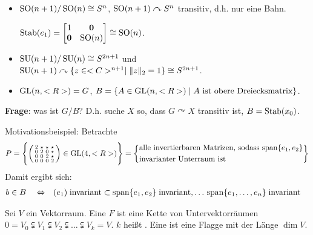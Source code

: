 \begin{example}
	\begin{itemize}
		\item $\operatorname{SO}(n+1)\slash \operatorname{SO}(n)\cong S^n$, $\operatorname{SO}(n+1)\curvearrowright S^n$ transitiv, d.h. nur eine Bahn.
		
		$\operatorname{Stab}(e_1) = \begin{bmatrix}
			1 & \boldsymbol 0 \\
			\boldsymbol 0 & \operatorname{SO}(n)
		\end{bmatrix}\cong\operatorname{SO}(n)$.
		\item $\operatorname{SU}(n+1) \slash \operatorname{SU}(n) \cong S^{2n+1}$ und $\operatorname{SU}(n+1)\curvearrowright \{ z\in <C>^{n+1}\mid \Vert z\Vert_2=1 \}\cong S^{2n+1}$.
		\item $\operatorname{GL}(n,<R>) = G$, $B=\{ A\in\operatorname{GL}(n,<R>)\mid\text{$A$ ist obere Dreiecksmatrix} \}$.
	\end{itemize}
\end{example}

\textbf{Frage}: was ist $G\slash B$? D.h. suche $X$ so, dass $G\curvearrowright X$ transitiv ist, $B=\operatorname{Stab}(x_0)$.

Motivationsbeispiel: Betrachte \begin{align*}
P = \Bigg\lbrace\begin{psmallmatrix}
2 & \star & \star & \star \\0 & 2 & 0 & \star \\0 & 0 & 2 & \star \\ 0 & 0 & 0 & 2
\end{psmallmatrix} \in\operatorname{GL}(4,<R>) \Bigg\rbrace = \bigg\lbrace\begin{aligned}[c]&\text{alle invertierbaren Matrizen, sodass $\operatorname{span}\{e_1,e_2\}$}\\
&\text{invarianter Unterraum ist}\end{aligned}\bigg\rbrace
\end{align*}
Damit ergibt sich: \begin{align*}
b\in B\quad\Leftrightarrow\quad \span(e_1)\;\text{invariant} \subset\Span\{e_1,e_2\}\;\text{invariant},\dots\,\Span\{e_1,\dots,e_n\}\;\text{invariant}
\end{align*}

\begin{definition}
	Sei $V$ ein Vektorraum. Eine  $F$ ist eine Kette von Untervektorräumen $0=V_0\subsetneqq V_1 \subsetneqq V_2\subsetneqq \dots\subsetneqq V_k = V$. $k$ heißt . Eine  ist eine Flagge mit der Länge $\dim V$.
\end{definition}

